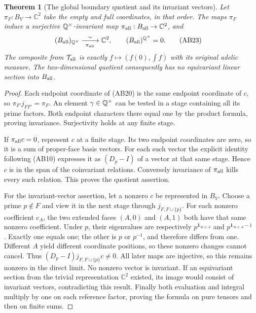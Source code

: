 \documentclass[11pt,a4paper]{article}
\newtheorem{theorem}{Theorem}[section]
\theoremstyle{definition}\newtheorem{definition}[theorem]{Definition}
\newcommand{\C}{\mathbb C}\newcommand{\R}{\mathbb R}
\begin{document}
\begin{theorem}[The global boundary quotient and its invariant vectors]
\label{thm:global-boundary}
Let $\pi_F:B_V\to\C^2$ take the empty and full coordinates, in that order.
The maps $\pi_F$ induce a surjective $\mathbb Q^\times$-invariant map
$\pi_{\rm all}:B_{\rm all}\to\C^2$, and
\[
 (B_{\rm all})_{\Q^\times}\xrightarrow[\ \pi_{\rm all}\ ]{\sim}\C^2,
 \qquad (B_{\rm all})^{\Q^\times}=0.
 \tag{AB23}
\]
The composite from $\mathcal T_{\rm all}$ is exactly
$f\mapsto(f(0),\int f)$ with its original adelic measure.
The two-dimensional quotient consequently has no equivariant linear
section into $B_{\rm all}$.
\end{theorem}
\begin{proof}
Each endpoint coordinate of (AB20) is the same endpoint coordinate of
$c$, so $\pi_{F'}j_{FF'}=\pi_F$. An element $\gamma\in\mathbb Q^\times$
can be tested in a stage containing all its prime factors. Both endpoint
characters there equal one by the product formula, proving invariance.
Surjectivity holds at any finite stage.

If $\pi_{\rm all}c=0$, represent $c$ at a finite stage. Its two endpoint
coordinates are zero, so it is a sum of proper-face basis vectors. For
each such vector the explicit identity following (AB10) expresses it as
$(D_p-I)$ of a vector at that same stage. Hence $c$ is in the span of
the coinvariant relations. Conversely invariance of $\pi_{\rm all}$
kills every such relation. This proves the quotient assertion.

For the invariant-vector assertion, let a nonzero $c$ be represented in
$B_V$. Choose a prime $p\notin F$ and view it in the next stage through
$j_{F,F\cup\{p\}}$. For each nonzero coefficient $c_A$, the two
extended faces $(A,0)$ and $(A,1)$ both have that same nonzero coefficient.
Under $p$, their eigenvalues are respectively
$p^{\mathbf1_{\infty\in A}}$ and
$p^{\mathbf1_{\infty\in A}-1}$. Exactly one equals one; the other is
$p$ or $p^{-1}$, and therefore differs from one. Different $A$ yield
different coordinate positions, so these nonzero changes cannot cancel.
Thus $(D_p-I)j_{F,F\cup\{p\}}c\ne0$. All later maps are injective, so
this remains nonzero in the direct limit. No nonzero vector is invariant.
If an equivariant section from the trivial representation $\C^2$ existed,
its image would consist of invariant vectors, contradicting this result.
Finally both evaluation and integral multiply by one on each reference
factor, proving the formula on pure tensors and then on finite sums.
\end{proof}
\end{document}
